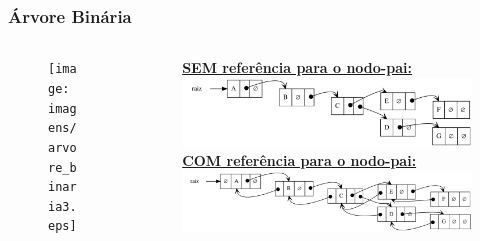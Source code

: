 \documentclass[aspectratio=169]{beamer}
\begin{document}
\begin{frame}\frametitle{Árvore Binária}
\begin{columns}[T]
\begin{column}{0.2\linewidth}
\begin{figure}[h]
	\centering
	\texttt{[image: imagens/arvore\_binaria3.eps]}
\end{figure}
\end{column}
\begin{column}{0.8\linewidth}
\vspace{-2mm}
\begin{figure}[h]
	\centering
	\textbf{\underline{SEM referência para o nodo-pai:}}\\	
	\includegraphics[height=0.3\paperheight]{imagens/arvore_binaria3-enc1.png}\\
	\textbf{\underline{COM referência para o nodo-pai:}}\\	
	\includegraphics[height=0.27\paperheight]{imagens/arvore_binaria3-enc2.png}
\end{figure}
\end{column}
\end{columns}
\end{frame}
\end{document}
